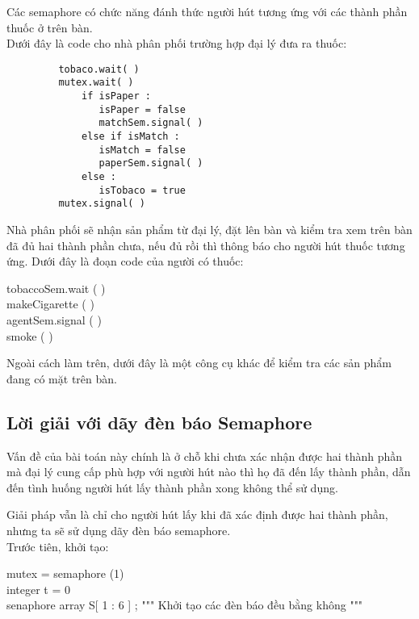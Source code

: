 \documentclass[a4paper]{article}
\begin{document}
	
	\hspace{4mm}Các semaphore có chức năng đánh thức người hút tương ứng với các thành phần thuốc ở trên bàn. \\
	Dưới đây là code cho nhà phân phối trường hợp đại lý đưa ra thuốc:
	\begin{tcolorbox}
		\begin{verbatim}
		 tobaco.wait( )
		 mutex.wait( ) 
		     if isPaper : 
		        isPaper = false
		        matchSem.signal( )
		     else if isMatch : 
		        isMatch = false
		        paperSem.signal( )
		     else :
		        isTobaco = true
		 mutex.signal( )
		\end{verbatim}
	\end{tcolorbox}
	Nhà phân phối sẽ nhận sản phẩm từ đại lý, đặt lên bàn và kiểm 
	tra xem trên bàn đã đủ hai thành phần chưa, nếu đủ rồi thì thông báo cho người hút thuốc tương ứng.
	Dưới đây là đoạn code của người có thuốc:
	\begin{tcolorbox}
		tobaccoSem.wait ( ) \\
		makeCigarette ( ) \\ 
		agentSem.signal ( ) \\
		smoke ( )
	\end{tcolorbox}
	
	Ngoài cách làm trên, dưới đây là một công cụ khác để kiểm tra các sản phẩm đang có mặt trên bàn.
	\subsection{Lời giải với dãy đèn báo Semaphore \cite{r3}}	
	Vấn đề của bài toán này chính là ở chỗ khi chưa xác nhận được hai thành phần mà đại lý cung cấp phù hợp với 
	người hút nào thì họ đã đến lấy thành phần, dẫn đến tình huống người hút lấy thành phần xong không thể sử dụng.
	
	
	Giải pháp vẫn là chỉ cho người hút lấy khi đã xác định được hai thành phần, nhưng ta sẽ sử dụng dãy đèn báo 
	semaphore. \\[0.5cm]	
	Trước tiên, khởi tạo:
	
	\begin{center}
		\begin{tcolorbox}
		mutex = semaphore (1) \\
		integer t = 0 \\ 
		senaphore array S[ 1 : 6 ] ; """ Khởi tạo các đèn báo đều bằng không """
		\end{tcolorbox}
	\end{center}
	
\end{document}
